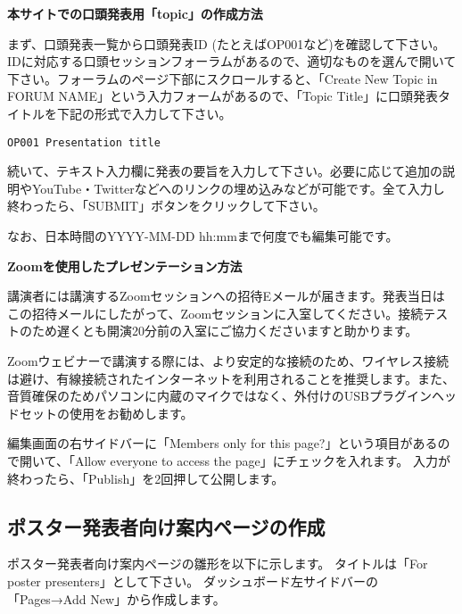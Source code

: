 \documentclass[titlepage,10pt,a4paper,uplatex]{jsbook}
\newenvironment{content}{\begin{shaded}\vspace{-1em}\raggedright\ttfamily\footnotesize\setlength{\baselineskip}{1.4em}}{\end{shaded}\vspace{-1em}}
\renewcommand{\textbf}[1]{{\bfseries\sffamily#1}}
\begin{document}
\begin{content}
\textbf{\Large 本サイトでの口頭発表用「topic」の作成方法}

まず、口頭発表一覧から口頭発表ID (たとえばOP001など)を確認して下さい。IDに対応する口頭セッションフォーラムがあるので、適切なものを選んで開いて下さい。フォーラムのページ下部にスクロールすると、「Create New Topic in FORUM NAME」という入力フォームがあるので、「Topic Title」に口頭発表タイトルを下記の形式で入力して下さい。

\texttt{OP001 Presentation title}

続いて、テキスト入力欄に発表の要旨を入力して下さい。必要に応じて追加の説明やYouTube・Twitterなどへのリンクの埋め込みなどが可能です。全て入力し終わったら、「SUBMIT」ボタンをクリックして下さい。

なお、日本時間のYYYY-MM-DD hh:mmまで何度でも編集可能です。

\textbf{\Large Zoomを使用したプレゼンテーション方法}

講演者には講演するZoomセッションへの招待Eメールが届きます。発表当日はこの招待メールにしたがって、Zoomセッションに入室してください。接続テストのため遅くとも開演20分前の入室にご協力くださいますと助かります。

Zoomウェビナーで講演する際には、より安定的な接続のため、ワイヤレス接続は避け、有線接続されたインターネットを利用されることを推奨します。また、音質確保のためパソコンに内蔵のマイクではなく、外付けのUSBプラグインヘッドセットの使用をお勧めします。
\end{content}

編集画面の右サイドバーに「Members only for this page?」という項目があるので開いて、「Allow everyone to access the page」にチェックを入れます。
入力が終わったら、「Publish」を2回押して公開します。

\subsection{ポスター発表者向け案内ページの作成}

ポスター発表者向け案内ページの雛形を以下に示します。
タイトルは「For poster presenters」として下さい。
ダッシュボード左サイドバーの「Pages→Add New」から作成します。
\end{document}
